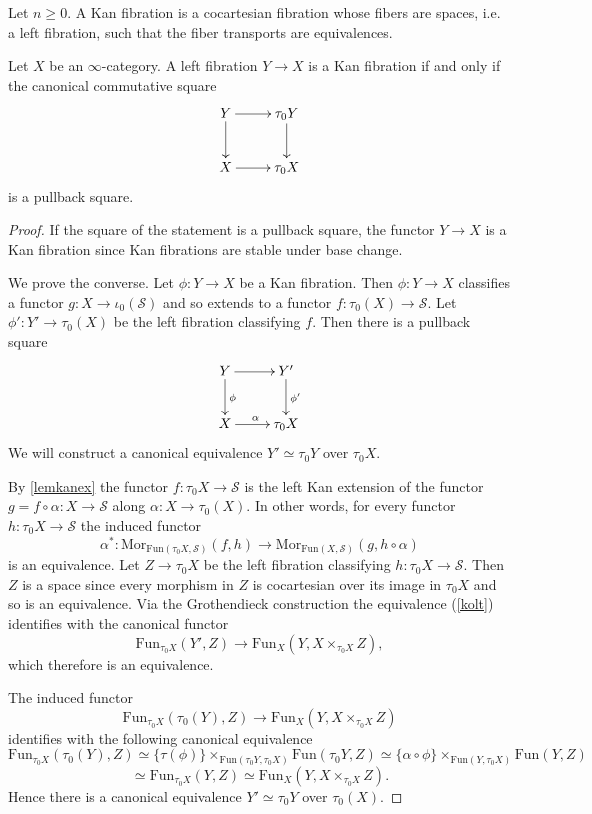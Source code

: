 \documentclass[10pt,oneside]{article}
\numberwithin{equation}{section} %
\numberwithin{figure}{section} %
\theoremstyle{plain}
\theoremstyle{definition}
\newcommand{\mS}{{\mathcal S}}
\newcommand{\Fun}{\mathrm{Fun}}
\newcommand{\Mor}{{\mathrm{Mor}}}
\begin{document}
\begin{definition}Let $n \geq 0$.
A Kan fibration is a cocartesian fibration whose fibers are spaces, i.e. a left fibration, such that the fiber transports are equivalences.
 
\end{definition}

\begin{proposition}
Let $X$ be an $\infty$-category.
A left fibration $Y \to X$ is a Kan fibration if and only if 
the canonical commutative square
$$\begin{xy}
\xymatrix{
Y \ar[d] \ar[r]
& \tau_0 Y \ar[d] 
\\ 
X \ar[r] & \tau_0 X}
\end{xy}$$	
is a pullback square.
    
\end{proposition}

\begin{proof}

If the square of the statement is a pullback square, the functor $Y \to X$ is a Kan fibration since Kan fibrations are stable under base change.

We prove the converse. Let $\phi: Y \to X$ be a Kan fibration.
Then $\phi: Y \to X$ classifies a functor $g: X \to \iota_0(\mS) $ and so extends to a functor $f: \tau_0(X) \to \mS.$
Let $\phi': Y' \to \tau_0(X)$ be the left fibration classifying $f.$
Then there is a pullback square
$$\begin{xy}
\xymatrix{
Y \ar[d]^{\phi} \ar[r]
& Y' \ar[d]^{\phi'}
\\ 
X \ar[r]^\alpha & \tau_0 X}
\end{xy}$$	
We will construct a canonical equivalence $Y' \simeq \tau_0 Y$ over $\tau_0 X.$

By \cref{lemkanex} the functor $f: \tau_0 X  \to \mS $ is the left Kan extension of the functor $g = f \circ \alpha: X \to \mS$ along $\alpha: X \to \tau_0(X).$ In other words, for every functor $h: \tau_0 X \to \mS $ the induced functor
\begin{equation}\label{kolt} \alpha^*: \Mor_{\Fun(\tau_0 X,\mS)}(f, h) \to \Mor_{\Fun(X,\mS)}(g, h \circ \alpha) \end{equation}
is an equivalence. Let $Z \to \tau_0 X $ be the left fibration classifying $h: \tau_0 X \to \mS $. Then $Z$ is a space since every morphism in $Z$ is cocartesian over its image in $\tau_0 X$ and so is an equivalence.
Via the Grothendieck construction the equivalence (\ref{kolt}) identifies with the canonical functor 
$$ \Fun_{\tau_0 X}(Y', Z) \to \Fun_{X}(Y, X \times_{\tau_0 X} Z),$$
which therefore is an equivalence.

The induced functor
$$ \Fun_{\tau_0 X}(\tau_0(Y), Z) \to \Fun_{X}(Y, X \times_{\tau_0 X} Z)$$ identifies with the following canonical equivalence
$$\Fun_{\tau_0 X}(\tau_0(Y), Z) \simeq \{ \tau(\phi)\} \times_{\Fun(\tau_0 Y , \tau_0 X)} \Fun(\tau_0 Y, Z) \simeq
\{ \alpha \circ \phi \} \times_{\Fun(Y, \tau_0 X)} \Fun(Y, Z) $$$$ \simeq \Fun_{\tau_0 X }(Y, Z) \simeq 
\Fun_X(Y, X \times_{\tau_0 X} Z). $$
Hence there is a canonical equivalence $Y' \simeq \tau_0 Y $ over $\tau_0(X) .$
\end{proof}
\end{document}
